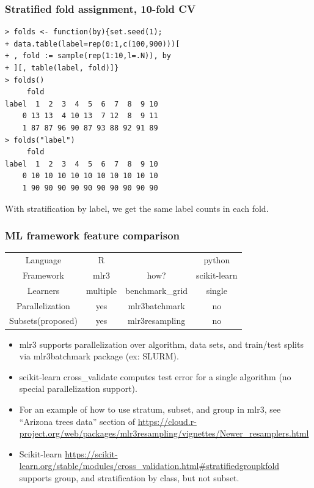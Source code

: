 \documentclass[t]{beamer}
\begin{document}
\begin{frame}[fragile]
  \frametitle{Stratified fold assignment, 10-fold CV}

\begin{verbatim}
> folds <- function(by){set.seed(1);
+ data.table(label=rep(0:1,c(100,900)))[
+ , fold := sample(rep(1:10,l=.N)), by
+ ][, table(label, fold)]}
> folds()
     fold
label  1  2  3  4  5  6  7  8  9 10
    0 13 13  4 10 13  7 12  8  9 11
    1 87 87 96 90 87 93 88 92 91 89
> folds("label")
     fold
label  1  2  3  4  5  6  7  8  9 10
    0 10 10 10 10 10 10 10 10 10 10
    1 90 90 90 90 90 90 90 90 90 90
\end{verbatim}

  With stratification by label, we get the same label counts in each
  fold.

\end{frame}

\begin{frame}[fragile]
  \frametitle{ML framework feature comparison}

  \begin{tabular}{cccc}
    Language & R& & python   \\
    Framework & mlr3& how? &  scikit-learn \\
    \hline
    Learners & multiple & benchmark\_grid & single \\
    Parallelization & yes & mlr3batchmark & no   \\
    Subsets(proposed) & yes & mlr3resampling & no  \\
  \end{tabular}

  \begin{itemize}
  \item mlr3 supports parallelization over algorithm, data sets, and
    train/test splits via mlr3batchmark package (ex: SLURM).
  \item scikit-learn cross\_validate computes test error for a single algorithm (no special parallelization support).
  \item
  For an example of how to use stratum, subset, and group in mlr3, see ``Arizona trees data'' section of
  \url{https://cloud.r-project.org/web/packages/mlr3resampling/vignettes/Newer_resamplers.html}
  \item 
  Scikit-learn
  \url{https://scikit-learn.org/stable/modules/cross_validation.html#stratifiedgroupkfold}
  supports group, and stratification by class, but not subset.
  \end{itemize}
\end{frame}
\end{document}
